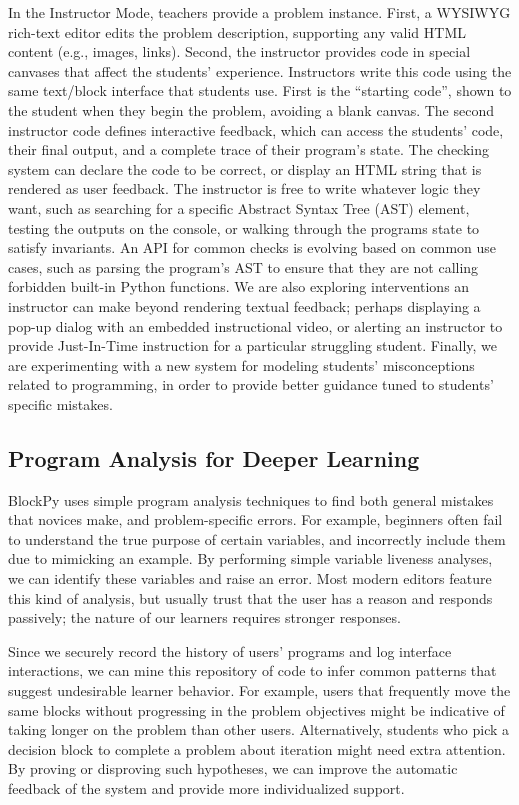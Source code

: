 \documentclass[10pt, conference, compsocconf]{IEEEtran}
\begin{document}
In the Instructor Mode, teachers provide a problem instance.
First, a WYSIWYG rich-text editor edits the problem description, supporting any valid HTML content (e.g., images, links). 
Second, the instructor provides code in special canvases that affect the students' experience.
Instructors write this code using the same text/block interface that students use.
First is the ``starting code'', shown to the student when they begin the problem, avoiding a blank canvas.
The second instructor code defines interactive feedback, which can access the students' code, their final output, and a complete trace of their program's state.
The checking system can declare the code to be correct, or display an HTML string that is rendered as user feedback.
The instructor is free to write whatever logic they want, such as searching for a specific Abstract Syntax Tree (AST) element, testing the outputs on the console, or walking through the programs state to satisfy invariants.
An API for common checks is evolving based on common use cases, such as parsing the program's AST to ensure that they are not calling forbidden built-in Python functions.
We are also exploring interventions an instructor can make beyond rendering textual feedback; perhaps displaying a pop-up dialog with an embedded instructional video, or alerting an instructor to provide Just-In-Time instruction for a particular struggling student.
Finally, we are experimenting with a new system for modeling students' misconceptions related to programming, in order to provide better guidance tuned to students' specific mistakes.

\subsection{Program Analysis for Deeper Learning} \label{PA-description}

BlockPy uses simple program analysis techniques to find both general mistakes that novices make, and problem-specific errors.
For example, beginners often fail to understand the true purpose of certain variables, and incorrectly include them due to mimicking an example.
By performing simple variable liveness analyses, we can identify these variables and raise an error.
Most modern editors feature this kind of analysis, but usually trust that the user has a reason and responds passively; the nature of our learners requires stronger responses.

Since we securely record the history of users' programs and log interface interactions,
we can mine this repository of code to infer common patterns that suggest undesirable learner behavior.
For example, users that frequently move the same blocks without progressing in the problem objectives might be indicative of taking longer on the problem than other users.
Alternatively, students who pick a decision block to complete a problem about iteration might need extra attention.
By proving or disproving such hypotheses, we can improve the automatic feedback of the system and provide more individualized support.
\end{document}
